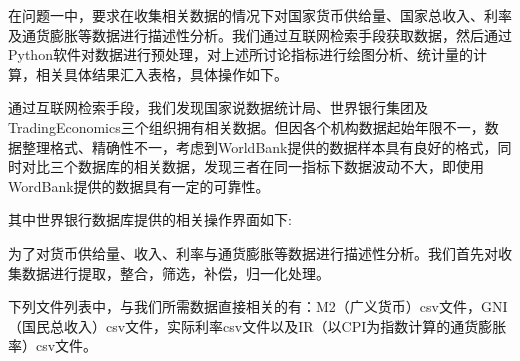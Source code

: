 


在问题一中，要求在收集相关数据的情况下对国家货币供给量、国家总收入、利率及通货膨胀等数据进行描述性分析。我们通过互联网检索手段获取数据，然后通过Python软件对数据进行预处理，对上述所讨论指标进行绘图分析、统计量的计算，相关具体结果汇入表格，具体操作如下。
	

通过互联网检索手段，我们发现国家说数据统计局、世界银行集团及TradingEconomics三个组织拥有相关数据。但因各个机构数据起始年限不一，数据整理格式、精确性不一，考虑到WorldBank提供的数据样本具有良好的格式，同时对比三个数据库的相关数据，发现三者在同一指标下数据波动不大，即使用WordBank提供的数据具有一定的可靠性。

其中世界银行数据库提供的相关操作界面如下:

	
为了对货币供给量、收入、利率与通货膨胀等数据进行描述性分析。我们首先对收集数据进行提取，整合，筛选，补偿，归一化处理。

下列文件列表中，与我们所需数据直接相关的有：M2（广义货币）csv文件，GNI（国民总收入）csv文件，实际利率csv文件以及IR（以CPI为指数计算的通货膨胀率）csv文件。

